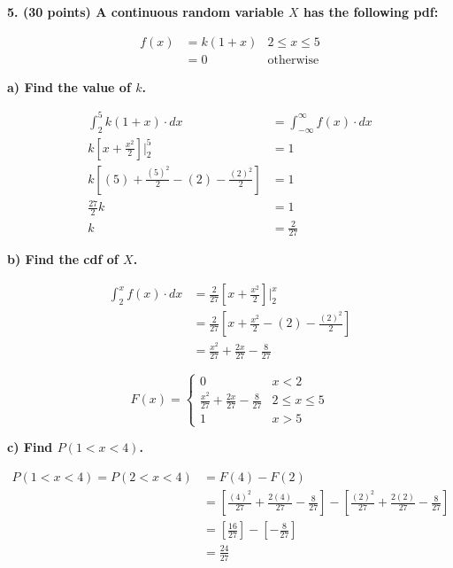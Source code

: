 \documentclass[12pt, letter]{article}
\begin{document}
\textbf{5. (30 points) A continuous random variable $X$ has the following pdf:}
\begin{center}
	\begin{align*}
		f(x) &= k(1+x) & 2 \le x \le 5 \\
		&=0 & \text{otherwise}
	\end{align*}
\end{center}

\pagebreak

\qquad \textbf{a) Find the value of $k$.}
\begin{center}
	\begin{align*}
		\int_{2}^{5} k(1 + x) \cdot dx &= \int_{-\infty}^{\infty} f(x) \cdot dx \\
		k\left[x + \frac{x^{2}}{2}\right] \Bigg|_{2}^{5} &= 1 \\
		k\left[(5) + \frac{(5)^{2}}{2} - (2) - \frac{(2)^{2}}{2}\right] &= 1 \\
		\frac{27}{2}k &= 1 \\
		k &= \boxed{\frac{2}{27}}
	\end{align*}
\end{center}

\qquad \textbf{b) Find the cdf of $X$.}
\begin{center}
	\begin{align*}
		\int_{2}^{x} f(x) \cdot dx &= \frac{2}{27}\left[x + \frac{x^{2}}{2}\right] \Bigg|_{2}^{x} \\
		&= \frac{2}{27}\left[x + \frac{x^{2}}{2} - (2) - \frac{(2)^{2}}{2}\right] \\
		&= \frac{x^{2}}{27} + \frac{2x}{27} - \frac{8}{27}
	\end{align*}
	
	\[F(x) = \left\{
    		\begin{array}{cc}
    			0 & x < 2 \\
    			\frac{x^{2}}{27} + \frac{2x}{27} - \frac{8}{27} & 2 \le x \le 5 \\
        		1 & x > 5
        	\end{array}
        \right.\]
\end{center}

\pagebreak

\qquad \textbf{c) Find $P(1 < x < 4)$.}
\begin{center}
	\begin{align*}
		P(1 < x < 4) = P(2 < x < 4) &= F(4) - F(2) \\
		&= \left[\frac{(4)^{2}}{27} + \frac{2(4)}{27} - \frac{8}{27}\right] - \left[\frac{(2)^{2}}{27} + \frac{2(2)}{27} - \frac{8}{27}\right] \\
		&= \left[\frac{16}{27}\right] - \left[-\frac{8}{27}\right] \\
		&= \boxed{\frac{24}{27}}
	\end{align*}
\end{center}
\end{document}
